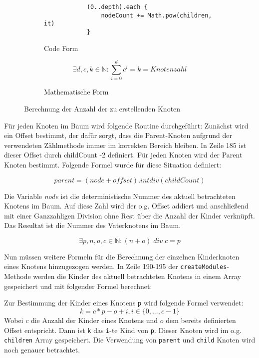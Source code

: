\begin{figure} [hbt!]
	\begin{subfigure}{\textwidth}
		\begin{lstlisting}
			(0..depth).each {
				nodeCount += Math.pow(children, it)
			}
		\end{lstlisting}
		\caption{Code Form}
		\label{fig:gen-module-code}
	\end{subfigure}

	\begin{subfigure}{\textwidth}
		\begin{framed}
			\[ \exists d, c, k \in \mathbb{N}: \sum_{i=0}^{d} c^{i} = k = Knotenzahl \]
		\end{framed}

		\caption{Mathematische Form}
		\label{fig:gen-module-formula}
	\end{subfigure}
	
	\caption{Berechnung der Anzahl der zu erstellenden Knoten}
	\label{fig:gen-module}
\end{figure}




Für jeden Knoten im Baum wird folgende Routine durchgeführt:
Zunächst wird ein Offset bestimmt, der dafür sorgt, dass die Parent-Knoten aufgrund der verwendeten Zählmethode immer im korrekten Bereich bleiben. 
In Zeile 185 ist dieser Offset durch childCount -2 definiert.
Für jeden Knoten wird der Parent Knoten bestimmt.
Folgende Formel wurde für diese Situation definiert:

\[parent = (node + offset).intdiv(childCount)\]

Die Variable \textit{node} ist die deterministische Nummer des aktuell betrachteten Knotens im Baum. 
Auf diese Zahl wird der o.g. Offset addiert und anschließend  mit einer Ganzzahligen Division ohne Rest über die Anzahl der Kinder verknüpft. Das Resultat ist die Nummer des Vaterknotens im Baum.

\[ \exists p, n, o, c \in \mathbb{N} : (n+o) \; div \; c =p \]

Nun müssen weitere Formeln für die Berechnung der einzelnen Kinderknoten eines Knotens hinzugezogen werden. 
In Zeile 190-195 der \texttt{createModules}-Methode werden die Kinder des aktuell betrachteten Knotens in einem Array gespeichert und mit folgender Formel berechnet:

Zur Bestimmung der Kinder eines Knotens \texttt{p} wird folgende Formel verwendet:
\[k= c*p-o+i, i \in \{0,...,c-1\}\]
Wobei $c$  die Anzahl der Kinder eines Knotens und $o$ dem bereits definierten Offset entspricht.
Dann ist \texttt{k} das \texttt{i}-te Kind von \texttt{p}.
Dieser Knoten wird im o.g. \texttt{children} Array gespeichert. 
Die Verwendung von \texttt{parent} und \texttt{child} Knoten wird noch genauer betrachtet.

